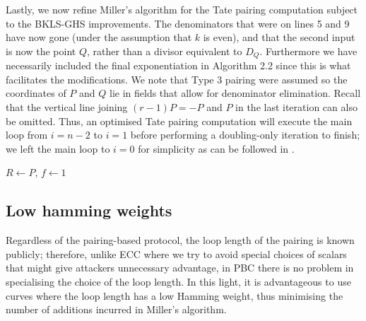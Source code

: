 Lastly, we now refine Miller's algorithm for the Tate pairing computation subject to the BKLS-GHS improvements. The denominators that were on lines 5 and 9 have now gone (under the assumption that $k$ is even), and that the second input is now the point $Q$, rather than a divisor equivalent to $D_Q$. Furthermore we  have necessarily included the final exponentiation in Algorithm 2.2 since this is what facilitates the modifications. 
We note that Type 3 pairing were assumed so the coordinates of $P$ and $Q$ lie in fields that allow for denominator elimination. Recall that the vertical line joining $(r-1)P = -P$ and $P$ in the last iteration can also be omitted. Thus, an optimised Tate pairing computation will execute the main loop from $i = n-2$ to $i = 1$ before performing a doubling-only iteration to finish; we left the main loop to $i = 0$ for simplicity as can be followed in .

\begin{algorithm}
	\caption{The BKLS-GHS version of Miller's algorithm for the Tate pairing.}
	$R \leftarrow P$, $f \leftarrow 1$\;
	\;
	\label{pseudo:millerbkls-ghs}
\end{algorithm}



\subsection{Low hamming weights}
\label{ssec:lowhamming}

Regardless of the pairing-based protocol, the loop length of the pairing is known
publicly; therefore, unlike ECC where we try to avoid special choices of scalars
that might give attackers unnecessary advantage, in PBC there is no problem in
specialising the choice of the loop length. In this light, it is advantageous to use
curves where the loop length has a low Hamming weight, thus minimising the
number of additions incurred in Miller’s algorithm.

